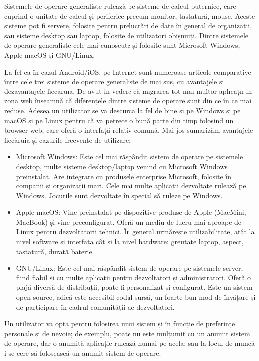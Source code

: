 Sistemele de operare generaliste rulează pe sisteme de calcul puternice, care cuprind o unitate de calcul și periferice precum monitor, tastatură, mouse. Aceste sisteme pot fi servere, folosite pentru prelucrări de date în general de organizații, sau sisteme desktop sau laptop, folosite de utilizatori obișnuiți. Dintre sistemele de operare generaliste cele mai cunoscute și folosite sunt Microsoft Windows, Apple macOS și GNU/Linux.

La fel ca în cazul Android/iOS, pe Internet sunt numeroase articole comparative între cele trei sisteme de operare generaliste de mai sus, cu avantajele și dezavantajele fiecăruia. De avut în vedere că migrarea tot mai multor aplicații în zona web înseamnă că diferențele dintre sisteme de operare sunt din ce în ce mai reduse. Adesea un utilizator se va descurca la fel de bine și pe Windows și pe macOS și pe Linux pentru că va petrece o bună parte din timp folosind un browser web, care oferă o interfață relativ comună. Mai jos sumarizăm avantajele fiecăruia și cazurile frecvente de utilizare:

\begin{itemize}
  \item Microsoft Windows: Este cel mai răspândit sistem de operare pe sistemele desktop, multe sisteme desktop/laptop venind cu Microsoft Windows preinstalat. Are integrare cu produsele enterprise Microsoft, folosite în companii și organizații mari. Cele mai multe aplicații dezvoltate rulează pe Windows. Jocurile sunt dezvoltate în special să ruleze pe Windows.
  \item Apple macOS: Vine preinstalat pe dispozitive produse de Apple (MacMini, MacBook) și vine preconfigurat. Oferă un mediu de lucru mai aproape de Linux pentru dezvoltatorii tehnici. În general urmărește utilizabilitate, atât la nivel software și interfața cât și la nivel hardware: greutate laptop, aspect, tastatură, durată baterie.
  \item GNU/Linux: Este cel mai răspândit sistem de operare pe sistemele server, fiind fiabil și cu multe aplicații pentru dezvoltatori și administratori. Oferă o plajă diversă de distribuții, poate fi personalizat și configurat. Este un sistem open source, adică este accesibil codul sursă, un foarte bun mod de învățare și de participare în cadrul comunității de dezvoltatori.
\end{itemize}

Un utilizator va opta pentru folosirea unui sistem și în funcție de preferințe personale și de nevoie; de exemplu, poate nu este mulțumit cu un anumit sistem de operare, dar o anumită aplicație rulează numai pe acela; sau la locul de muncă i se cere să folosească un anumit sistem de operare.

